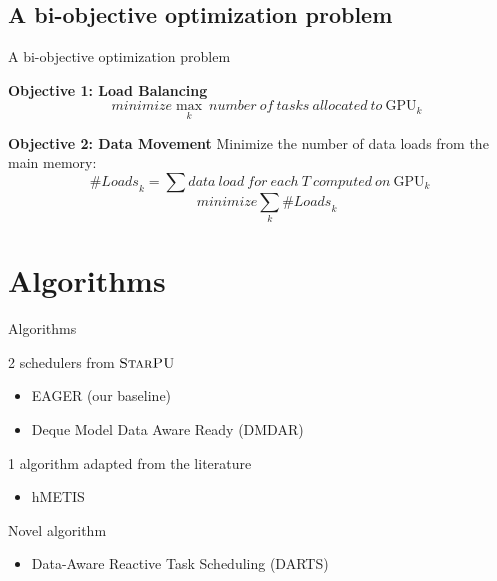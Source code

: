\documentclass{libs/ufc_format}
\newcommand{\nbloads}{\ensuremath{\mathit{\mathit{\#Loads}}}\xspace}
\newcommand{\starpu}{\textsc{StarPU}\xspace}
\newcommand{\GPU}[1]{\ensuremath{\mathrm{GPU}_{#1}}\xspace}
\begin{document}
\subsection{A bi-objective optimization problem}
\begin{frame}{A bi-objective optimization problem}
\begin{block}{\bf Objective 1: Load Balancing}
  $$\quad \mathit{minimize} \max_{k}~number~of~tasks~allocated~to~\GPU{k}$$
\end{block}

\begin{block}{\bf Objective 2: Data Movement}
	Minimize the number of data loads from the main memory:
$$
\nbloads_k =\sum data~load~for~each~T~computed~on~\GPU{k}
$$
  $$\quad  \mathit{minimize} \sum_k \nbloads_k$$
\end{block}


\end{frame}

\section{Algorithms}
\begin{frame}{Algorithms}
\begin{block}{2 schedulers from $\starpu$}
	\begin{itemize}
		\item EAGER (our baseline)
		\item Deque Model Data Aware Ready (DMDAR)
	\end{itemize}
\end{block}
\begin{block}{1 algorithm adapted from the literature}
	\begin{itemize}
		\item hMETIS
	\end{itemize}
\end{block}
\begin{block}{Novel algorithm}
	\begin{itemize}
		\item Data-Aware Reactive Task Scheduling (DARTS)
	\end{itemize}
\end{block}
\end{frame}
\end{document}

